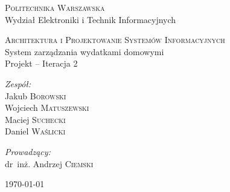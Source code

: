 \documentclass[parindent=0pt,11pt,a4paper]{article}
\begin{document}
\begin{titlepage}
  \begin{center}

    \textsc{\Large Politechnika Warszawska}\\[0.1cm]
    \small Wydział Elektroniki i Technik Informacyjnych
    \vfill

    \textsc{\small Architektura i Projektowanie Systemów Informacyjnych}\\[0.1cm]
    \Huge System zarządzania wydatkami domowymi\\[1.5cm]
    \small Projekt -- Iteracja 2\\[2.5cm]

    \vfill

    \begin{minipage}{0.4\textwidth}
      \begin{flushleft} \large
        \emph{Zespół:}\\[0.1cm]
        Jakub \textsc{Borowski}\\
        Wojciech \textsc{Matuszewski}\\
        Maciej \textsc{Suchecki}\\
        Daniel \textsc{Waślicki}\\
      \end{flushleft}
    \end{minipage}
    \begin{minipage}{0.4\textwidth}
      \begin{flushright} \large
        \emph{Prowadzący:}\\[0.1cm]
        dr~inż. Andrzej \textsc{Ciemski}\\[1cm]
      \end{flushright}
    \end{minipage}

    \vfill
    {\large \today}

  \end{center}
\end{titlepage}

\newpage
\tableofcontents

\newpage

\newpage

\newpage

\newpage

\newpage

%
\end{document}
